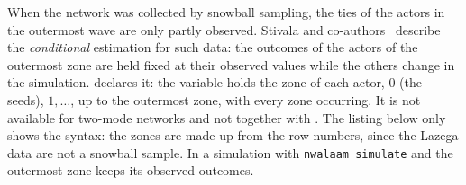 When the network was collected by snowball sampling, the ties of the actors in the outermost wave are only partly observed. Stivala and co-authors~\cite{stivala2020} describe the \emph{conditional} estimation for such data: the outcomes of the actors of the outermost zone are held fixed at their observed values while the others change in the simulation.  declares it: the variable holds the zone of each actor, $0$ (the seeds), $1,\dots$, up to the outermost zone, with every zone occurring. It is not available for two-mode networks and not together with . The listing below only shows the syntax: the zones are made up from the row numbers, since the Lazega data are not a snowball sample.
In a simulation with \texttt{nwalaam simulate} and  the outermost zone keeps its observed outcomes.
